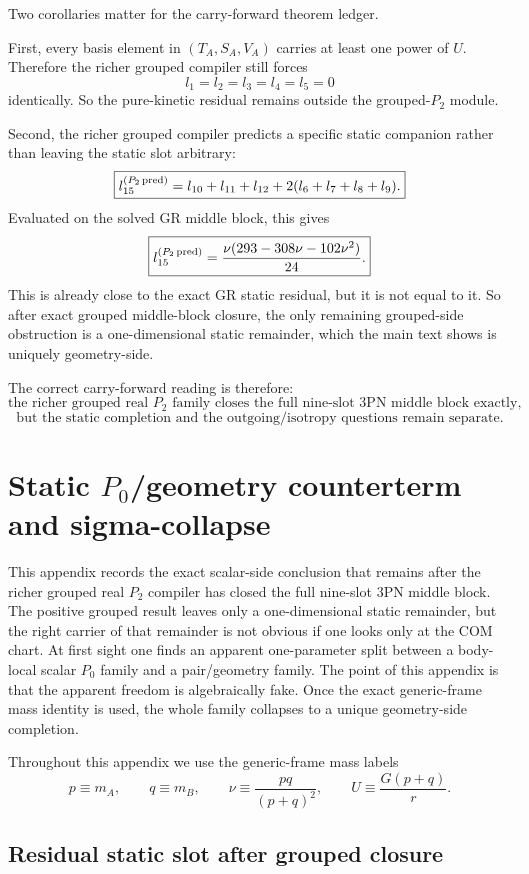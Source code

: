 \documentclass[11pt]{article}
\begin{document}
Two corollaries matter for the carry-forward theorem ledger.

First, every basis element in $(T_A,S_A,V_A)$ carries at least one power of $U$. Therefore the richer grouped compiler still forces
\[
\boxed{l_1=l_2=l_3=l_4=l_5=0}
\]
identically. So the pure-kinetic residual remains outside the grouped-$P_2$ module.

Second, the richer grouped compiler predicts a specific static companion rather than leaving the static slot arbitrary:
\[
\boxed{l_{15}^{(P_2\,\rm pred)}=l_{10}+l_{11}+l_{12}+2(l_6+l_7+l_8+l_9).}
\]
Evaluated on the solved GR middle block, this gives
\[
\boxed{l_{15}^{(P_2\,\rm pred)}=\frac{\nu(293-308\nu-102\nu^2)}{24}.}
\]
This is already close to the exact GR static residual, but it is not equal to it. So after exact grouped middle-block closure, the only remaining grouped-side obstruction is a one-dimensional static remainder, which the main text shows is uniquely geometry-side.

The correct carry-forward reading is therefore:
\[
\boxed{\text{the richer grouped real }P_2\text{ family closes the full nine-slot }3\text{PN middle block exactly,}}
\]
\[
\boxed{\text{but the static completion and the outgoing/isotropy questions remain separate.}}
\]

\section{Static \texorpdfstring{$P_0$}{P 0}/geometry counterterm and sigma-collapse}
\label{app:static_p0_geometry_counterterm_sigma_collapse}

This appendix records the exact scalar-side conclusion that remains after the richer grouped real $P_2$ compiler has closed the full nine-slot $3$PN middle block. The positive grouped result leaves only a one-dimensional static remainder, but the right carrier of that remainder is not obvious if one looks only at the COM chart. At first sight one finds an apparent one-parameter split between a body-local scalar $P_0$ family and a pair/geometry family. The point of this appendix is that the apparent freedom is algebraically fake. Once the exact generic-frame mass identity is used, the whole family collapses to a unique geometry-side completion.

Throughout this appendix we use the generic-frame mass labels
\[
p\equiv m_A,
\qquad
q\equiv m_B,
\qquad
\nu\equiv \frac{pq}{(p+q)^2},
\qquad
U\equiv \frac{G(p+q)}{r}.
\]

\subsection{Residual static slot after grouped closure}
\label{app:static_p0_geometry_counterterm_sigma_collapse:residual_slot}
\end{document}
